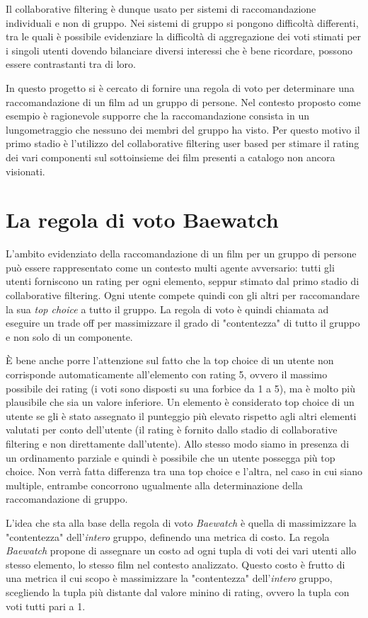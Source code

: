 \documentclass[letterpaper]{article}
\begin{document}
Il collaborative filtering è dunque usato per sistemi di raccomandazione individuali e non di gruppo. Nei sistemi di gruppo si pongono difficoltà differenti, tra le quali è possibile evidenziare la difficoltà di aggregazione dei voti stimati per i singoli utenti dovendo bilanciare diversi interessi che è bene ricordare, possono essere contrastanti tra di loro. 

In questo progetto si è cercato di fornire una regola di voto per determinare una raccomandazione di un film ad un gruppo di persone. Nel contesto proposto come esempio è ragionevole supporre che la raccomandazione consista in un lungometraggio che nessuno dei membri del gruppo ha visto. Per questo motivo il primo stadio è l'utilizzo del collaborative filtering user based per stimare il rating dei vari componenti sul sottoinsieme dei film presenti a catalogo non ancora visionati.

\section{La regola di voto Baewatch}
L'ambito evidenziato della raccomandazione di un film per un gruppo di persone può essere rappresentato come un contesto multi agente avversario: tutti gli utenti forniscono un rating per ogni elemento, seppur stimato dal primo stadio di collaborative filtering. Ogni utente compete quindi con gli altri per raccomandare la sua \emph{top choice} a tutto il gruppo. La regola di voto è quindi chiamata ad eseguire un trade off per massimizzare il grado di "contentezza" di tutto il gruppo e non solo di un componente.

\`E bene anche porre l'attenzione sul fatto che la top choice di un utente non corrisponde automaticamente all'elemento con rating 5, ovvero il massimo possibile dei rating (i voti sono disposti su una forbice da 1 a 5), ma è molto più plausibile che sia un valore inferiore. Un elemento è considerato top choice di un utente se gli è stato assegnato il punteggio più elevato rispetto agli altri elementi valutati per conto dell'utente (il rating è fornito dallo stadio di collaborative filtering e non direttamente dall'utente). Allo stesso modo siamo in presenza di un ordinamento parziale e quindi è possibile che un utente possegga più top choice. Non verrà fatta differenza tra una top choice e l'altra, nel caso in cui siano multiple, entrambe concorrono ugualmente alla determinazione della raccomandazione di gruppo.

L'idea che sta alla base della regola di voto \emph{Baewatch} è quella di massimizzare la "contentezza" dell'\emph{intero} gruppo, definendo una metrica di costo. La regola \emph{Baewatch} propone di assegnare un costo ad ogni tupla di voti dei vari utenti allo stesso elemento, lo stesso film nel contesto analizzato. Questo costo è frutto di una metrica il cui scopo è massimizzare la "contentezza" dell'\emph{intero} gruppo, scegliendo la tupla più distante dal valore minino di rating, ovvero la tupla con voti tutti pari a 1.
\end{document}
